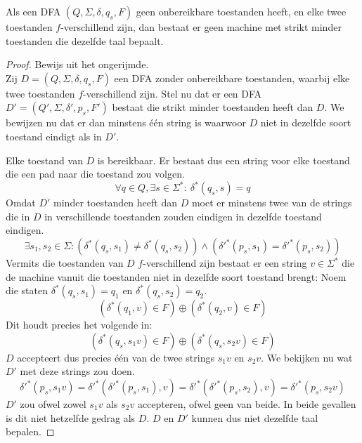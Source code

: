 \documentclass[main.tex]{subfiles}
\begin{document}
\begin{st}
  Als een DFA $(Q,\Sigma,\delta,q_{s},F)$ geen onbereikbare toestanden heeft, en elke twee toestanden $f$-verschillend zijn, dan bestaat er geen machine met strikt minder toestanden die dezelfde taal bepaalt.

  \begin{proof}
    Bewijs uit het ongerijmde.\\
    Zij $D = (Q,\Sigma,\delta,q_{s},F)$ een DFA zonder onbereikbare toestanden, waarbij elke twee toestanden $f$-verschillend zijn.
    Stel nu dat er een DFA $D' = (Q',\Sigma,\delta',p_{s},F')$ bestaat die strikt minder toestanden heeft dan $D$. We bewijzen nu dat er dan minstens \'e\'en string is waarwoor $D$ niet in dezelfde soort toestand eindigt als in $D'$.
    
    Elke toestand van $D$ is bereikbaar.
    Er bestaat dus een string voor elke toestand die een pad naar die toestand zou volgen.
    \[ \forall q\in Q, \exists s\in \Sigma^{*}:\ \delta^{*}(q_{s},s) = q \]
    Omdat $D'$ minder toestanden heeft dan $D$ moet er minstens twee van de strings die in $D$ in verschillende toestanden zouden eindigen in dezelfde toestand eindigen.
    \[ \exists s_{1},s_{2} \in \Sigma: (\delta^{*}(q_{s},s_{1}) \neq \delta^{*}(q_{s},s_{2})) \wedge (\delta'^{*}(p_{s},s_{1}) = \delta'^{*}(p_{s},s_{2})) \]
    Vermits die toestanden van $D$ $f$-verschillend zijn bestaat er een string $v\in \Sigma^{*}$ die de machine vanuit die toestanden niet in dezelfde soort toestand brengt:
    Noem die staten $\delta^{*}(q_{s},s_{1}) = q_{1}$ en $\delta^{*}(q_{s},s_{2}) = q_{2}$.
    \[ (\delta^{*}(q_{1},v) \in F) \oplus (\delta^{*}(q_{2},v) \in F) \]
    Dit houdt precies het volgende in:
    \[ (\delta^{*}(q_{s},s_{1}v) \in F) \oplus (\delta^{*}(q_{s},s_{2}v) \in F) \]
    $D$ accepteert dus precies \'e\'en van de twee strings $s_{1}v$ en $s_{2}v$.
    We bekijken nu wat $D'$ met deze strings zou doen.
    \[ \delta'^{*}(p_{s},s_{1}v) = \delta'^{*}(\delta'^{*}(p_{s},s_{1}),v) = \delta'^{*}(\delta'^{*}(p_{s},s_{2}),v) = \delta'^{*}(p_{s},s_{2}v) \]
    $D'$ zou ofwel zowel $s_{1}v$ als $s_{2}v$ accepteren, ofwel geen van beide.
    In beide gevallen is dit niet hetzelfde gedrag als $D$.
    $D$ en $D'$ kunnen dus niet dezelfde taal bepalen.
  \end{proof}
\end{st}
\end{document}
